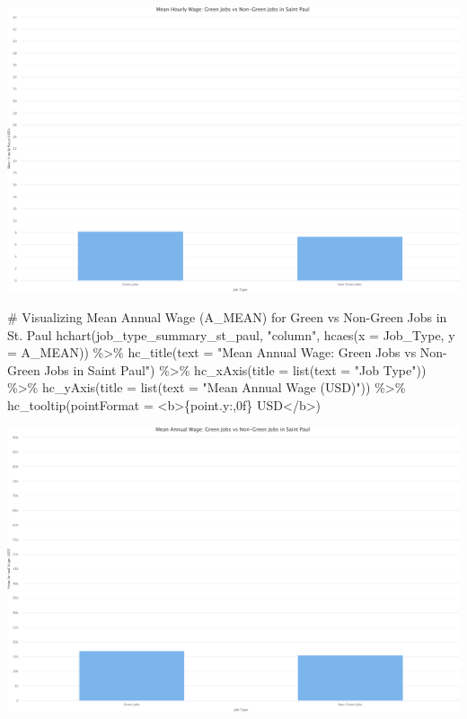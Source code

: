 \documentclass[
  letterpaper,
  DIV=11,
  numbers=noendperiod]{scrartcl}
\newenvironment{Shaded}{\begin{snugshade}}{\end{snugshade}}
\newcommand{\AttributeTok}[1]{\textcolor[rgb]{0.40,0.45,0.13}{#1}}
\newcommand{\CommentTok}[1]{\textcolor[rgb]{0.37,0.37,0.37}{#1}}
\newcommand{\FunctionTok}[1]{\textcolor[rgb]{0.28,0.35,0.67}{#1}}
\newcommand{\NormalTok}[1]{\textcolor[rgb]{0.00,0.23,0.31}{#1}}
\newcommand{\SpecialCharTok}[1]{\textcolor[rgb]{0.37,0.37,0.37}{#1}}
\newcommand{\StringTok}[1]{\textcolor[rgb]{0.13,0.47,0.30}{#1}}
\begin{document}
\includegraphics{index_files/figure-pdf/unnamed-chunk-21-6.pdf}

\begin{Shaded}
\begin{Highlighting}[]
\CommentTok{\# Visualizing Mean Annual Wage (A\_MEAN) for Green vs Non{-}Green Jobs in St. Paul}
\FunctionTok{hchart}\NormalTok{(job\_type\_summary\_st\_paul, }\StringTok{"column"}\NormalTok{, }\FunctionTok{hcaes}\NormalTok{(}\AttributeTok{x =}\NormalTok{ Job\_Type, }\AttributeTok{y =}\NormalTok{ A\_MEAN)) }\SpecialCharTok{\%\textgreater{}\%}
  \FunctionTok{hc\_title}\NormalTok{(}\AttributeTok{text =} \StringTok{"Mean Annual Wage: Green Jobs vs Non{-}Green Jobs in Saint Paul"}\NormalTok{) }\SpecialCharTok{\%\textgreater{}\%}
  \FunctionTok{hc\_xAxis}\NormalTok{(}\AttributeTok{title =} \FunctionTok{list}\NormalTok{(}\AttributeTok{text =} \StringTok{"Job Type"}\NormalTok{)) }\SpecialCharTok{\%\textgreater{}\%}
  \FunctionTok{hc\_yAxis}\NormalTok{(}\AttributeTok{title =} \FunctionTok{list}\NormalTok{(}\AttributeTok{text =} \StringTok{"Mean Annual Wage (USD)"}\NormalTok{)) }\SpecialCharTok{\%\textgreater{}\%}
  \FunctionTok{hc\_tooltip}\NormalTok{(}\AttributeTok{pointFormat =} \StringTok{\textquotesingle{}\textless{}b\textgreater{}\{point.y:,0f\} USD\textless{}/b\textgreater{}\textquotesingle{}}\NormalTok{)}
\end{Highlighting}
\end{Shaded}

\includegraphics{index_files/figure-pdf/unnamed-chunk-21-7.pdf}
\end{document}
